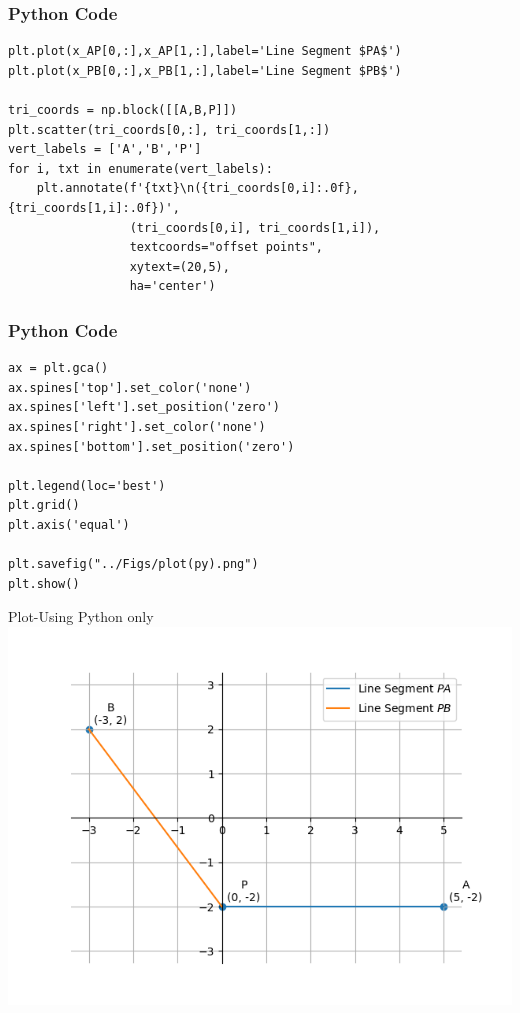 \documentclass{beamer}
\begin{document}
\begin{frame}[fragile]
    \frametitle{Python Code}
    \begin{lstlisting}
plt.plot(x_AP[0,:],x_AP[1,:],label='Line Segment $PA$')
plt.plot(x_PB[0,:],x_PB[1,:],label='Line Segment $PB$')

tri_coords = np.block([[A,B,P]])
plt.scatter(tri_coords[0,:], tri_coords[1,:])
vert_labels = ['A','B','P']
for i, txt in enumerate(vert_labels):
    plt.annotate(f'{txt}\n({tri_coords[0,i]:.0f}, {tri_coords[1,i]:.0f})',
                 (tri_coords[0,i], tri_coords[1,i]), 
                 textcoords="offset points", 
                 xytext=(20,5), 
                 ha='center') 
\end{lstlisting}
\end{frame}

\begin{frame}[fragile]
    \frametitle{Python Code}
    \begin{lstlisting}
ax = plt.gca()
ax.spines['top'].set_color('none')
ax.spines['left'].set_position('zero')
ax.spines['right'].set_color('none')
ax.spines['bottom'].set_position('zero')

plt.legend(loc='best')
plt.grid() 
plt.axis('equal')

plt.savefig("../Figs/plot(py).png")
plt.show()

    \end{lstlisting}
\end{frame}


\begin{frame}{Plot-Using Python only}
    \centering
    \includegraphics[width=\columnwidth, height=0.8\textheight, keepaspectratio]{Figs/plot(py).png}     
\end{frame}
\end{document}
